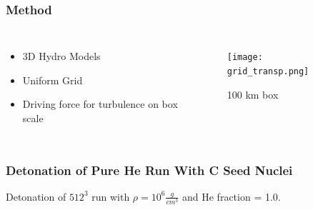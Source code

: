 \documentclass{beamer}
\begin{document}





\begin{frame}
\frametitle{Method}

\begin{columns}[c]
        \begin{itemize}
                \item 3D Hydro Models
                \item Uniform Grid
                \item Driving force for turbulence on box scale
        \end{itemize}


        \vspace{25pt}
        \begin{figure}
    \begin{center}
      \texttt{[image: grid\_transp.png]}
	    \caption{100 km box}
    \end{center}
  \end{figure}

        \end{columns}

\end{frame}





\begin{frame}
	
	\frametitle{Detonation of Pure He Run With C Seed Nuclei}
	\begin{center}
	\end{center}
	\begin{center} 
		Detonation of $512^{3}$ run with $\rho = 10^6 \frac{g}{cm^3}$ and He fraction = 1.0.
	\end{center}
\end{frame}
\end{document}
